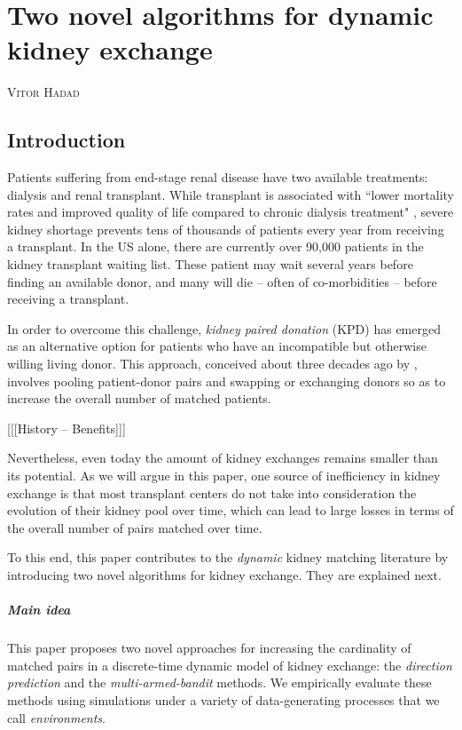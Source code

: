 \chapter*{Two novel algorithms for dynamic kidney exchange}
\begin{center}
\large
\textsc{Vitor Hadad}
\end{center}



\doublespacing

\section{Introduction}

Patients suffering from end-stage renal disease have two available treatments: dialysis and renal transplant. While transplant is associated with ``lower mortality rates and improved quality of life compared to chronic dialysis treatment" \citep{tonelli2011systematic}, severe kidney shortage prevents tens of thousands of patients every year from receiving a transplant. In the US alone, there are currently over 90,000 patients in the kidney transplant waiting list. These patient may wait several years before finding an available donor, and many will die -- often of co-morbidities -- before receiving a transplant.

In order to overcome this challenge, \emph{kidney paired donation} (KPD) has emerged as an alternative option for patients who have an incompatible but otherwise willing living donor. This approach, conceived about three decades ago by \cite{rapaport1986case}, involves pooling patient-donor pairs and swapping or exchanging donors so as to increase the overall number of matched patients.

[[[History -- Benefits]]]

Nevertheless, even today the amount of kidney exchanges remains smaller than its potential. As we will argue in this paper, one source of inefficiency in kidney exchange is that most transplant centers do not take into consideration the evolution of their kidney pool over time, which can lead to large losses in terms of the overall number of pairs matched over time.

To this end, this paper contributes to the \emph{dynamic} kidney matching literature by introducing two novel algorithms for kidney exchange. They are explained next.

\paragraph{\textbf{Main idea}} This paper proposes two novel approaches for increasing the cardinality of matched pairs in a discrete-time dynamic model of kidney exchange: the \emph{direction prediction} and the \emph{multi-armed-bandit} methods. We empirically evaluate these methods using simulations under a variety of data-generating processes that we call \emph{environments}. 

